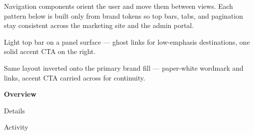 
Navigation components orient the user and move them between views. Each pattern
below is built only from brand tokens so top bars, tabs, and pagination stay
consistent across the marketing site and the admin portal.

\vspace{4mm}

\colorbox{panel}{}

{\small\color{muted} Light top bar on a panel surface --- ghost links for
low-emphasis destinations, one solid accent CTA on the right.}

\vspace{5mm}

\colorbox{primary}{}

{\small\color{muted} Same layout inverted onto the primary brand fill ---
paper-white wordmark and links, accent CTA carried across for continuity.}

\vspace{5mm}

\begin{minipage}[t]{0.30\linewidth}
{\color{ink}\textbf{Overview}}\\[1mm]
\end{minipage}\quad
\begin{minipage}[t]{0.30\linewidth}
{\color{muted}Details}\\[1mm]
\end{minipage}\quad
\begin{minipage}[t]{0.30\linewidth}
{\color{muted}Activity}\\[1mm]
\end{minipage}


